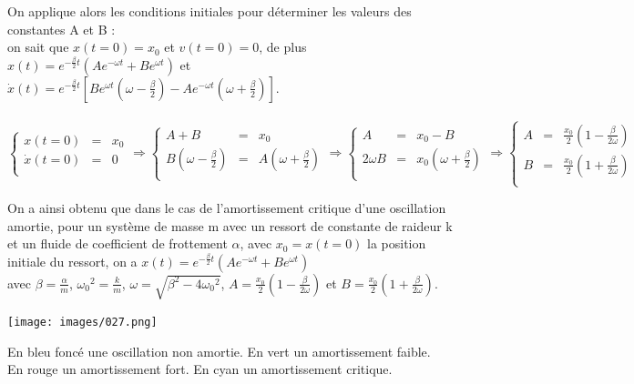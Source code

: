 \documentclass[a4paper,10pt]{book}
\begin{document}
On applique alors les conditions initiales pour déterminer les valeurs des constantes A et B :\\
on sait que $x(t=0)=x_{0}$ et $v(t=0)=0$, de plus $x(t)=e^{-\frac{\beta}{2}t}(Ae^{-\omega t}+Be^{\omega t})$ et\\
$\dot{x}(t)=e^{-\frac{\beta}{2}t}[Be^{\omega t}(\omega-\frac{\beta}{2})-Ae^{-\omega t}(\omega+\frac{\beta}{2})]$.\\\\
$\left \{ \begin{array}{rcl}
x(t=0)&=&x_{0}\\
\dot{x}(t=0)&=&0\\
\end{array} \right. \Rightarrow \left \{ \begin{array}{rcl}
A+B&=&x_{0} \\
B(\omega-\frac{\beta}{2})&=&A(\omega+\frac{\beta}{2}) \\
\end{array} \right. \Rightarrow \left \{ \begin{array}{rcl}
A&=&x_{0}-B\\
2\omega B&=&x_{0}(\omega+\frac{\beta}{2}) \\
\end{array} \right. \Rightarrow \left \{ \begin{array}{rcl}
A&=&\frac{x_{0}}{2}(1-\frac{\beta}{2\omega}) \\
B&=&\frac{x_{0}}{2}(1+\frac{\beta}{2\omega}) \\
\end{array} \right.$

\bigskip

On a ainsi obtenu que dans le cas de l’amortissement critique d’une oscillation amortie, pour un système de masse m avec un ressort de constante de raideur k et un fluide de coefficient de frottement $\alpha$, avec $x_{0}=x(t=0)$ la position initiale du ressort, on a $x(t)=e^{-\frac{\beta}{2}t}(Ae^{-\omega t}+Be^{\omega t})$\\
avec $\beta=\frac{\alpha}{m}$, $\omega_{0}{}^{2}=\frac{k}{m}$, $\omega=\sqrt{\beta^{2}-4\omega_{0}{}^{2}}$, $A=\frac{x_{0}}{2}(1-\frac{\beta}{2\omega})$ et $B=\frac{x_{0}}{2}(1+\frac{\beta}{2\omega})$.

\begin{center}
\texttt{[image: images/027.png]}
\end{center}
En bleu foncé une oscillation non amortie. En vert un amortissement faible.\\
En rouge un amortissement fort. En cyan un amortissement critique.
\end{document}
